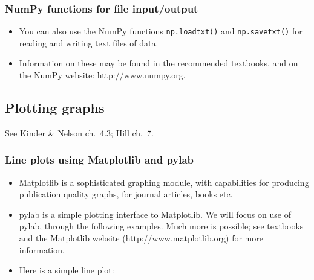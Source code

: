\documentclass[10pt]{article}
\providecommand{\tightlist}{%
      \setlength{\itemsep}{0pt}\setlength{\parskip}{0pt}}
\begin{document}
    \hypertarget{numpy-functions-for-file-inputoutput}{%
\subsubsection{NumPy functions for file
input/output}\label{numpy-functions-for-file-inputoutput}}

\begin{itemize}
\tightlist
\item
  You can also use the NumPy functions \texttt{np.loadtxt()} and
  \texttt{np.savetxt()} for reading and writing text files of data.
\item
  Information on these may be found in the recommended textbooks, and on
  the NumPy website: http://www.numpy.org.
\end{itemize}

    \hypertarget{plotting-graphs}{%
\subsection{Plotting graphs}\label{plotting-graphs}}

See Kinder \& Nelson ch.~4.3; Hill ch.~7.

\hypertarget{line-plots-using-matplotlib-and-pylab}{%
\subsubsection{Line plots using Matplotlib and
pylab}\label{line-plots-using-matplotlib-and-pylab}}

\begin{itemize}
\tightlist
\item
  Matplotlib is a sophisticated graphing module, with capabilities for
  producing publication quality graphs, for journal articles, books etc.
\item
  pylab is a simple plotting interface to Matplotlib. We will focus on
  use of pylab, through the following examples. Much more is possible;
  see textbooks and the Matplotlib website (http://www.matplotlib.org)
  for more information.
\item
  Here is a simple line plot:
\end{itemize}
\end{document}
